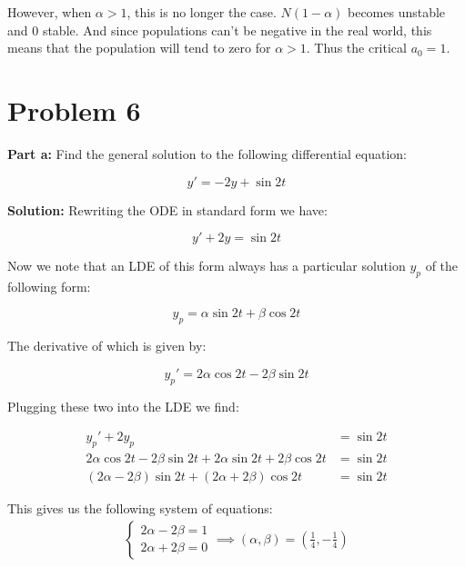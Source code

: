 \documentclass{article}
\begin{document}
However, when $\alpha>1$, this is no longer the case. $N(1-\alpha)$ becomes unstable and $0$ stable. And since populations can't be negative in the real world, this means that the population will tend to zero for $\alpha>1$. Thus the critical $a_0=1$.

\section*{Problem 6}
\noindent\textbf{Part a:} Find the general solution to the following differential equation:

\begin{equation*}
    y'=-2y+\sin 2t
\end{equation*}

\noindent\textbf{Solution:} Rewriting the ODE in standard form we have:

\begin{equation*}
    y'+2y=\sin 2t
\end{equation*}

Now we note that an LDE of this form always has a particular solution $y_p$ of the following form:

\begin{equation*}
    y_p=\alpha\sin 2t+\beta\cos 2t
\end{equation*}

The derivative of which is given by:

\begin{equation*}
    y_p'=2\alpha\cos 2t-2\beta\sin 2t
\end{equation*}

Plugging these two into the LDE we find:

\begin{align*}
    y_p'+2y_p&=\sin 2t\\
    2\alpha\cos 2t-2\beta\sin 2t+2\alpha\sin 2t+2\beta\cos 2t&=\sin 2t\\
    (2\alpha-2\beta)\sin 2t+(2\alpha+2\beta)\cos 2t&=\sin 2t
\end{align*}

This gives us the following system of equations:
\begin{align*}
    \begin{cases}
        2\alpha-2\beta=1\\
        2\alpha+2\beta=0
    \end{cases}\implies (\alpha,\beta)=\left(\frac{1}{4},-\frac{1}{4}\right)
\end{align*}
\end{document}
